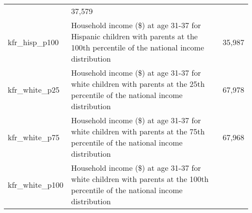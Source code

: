 \documentclass[]{book}
\begin{document}
\begin{longtable}[]{@{}lll@{}}
\begin{minipage}[t]{0.04\columnwidth}
\end{minipage} & \begin{minipage}[t]{0.04\columnwidth}\raggedright\strut
37,579\strut
\end{minipage}\tabularnewline
\begin{minipage}[t]{0.04\columnwidth}\raggedright\strut
kfr\_hisp\_p100\strut
\end{minipage} & \begin{minipage}[t]{0.04\columnwidth}\raggedright\strut
Household income (\$) at age 31-37 for Hispanic children with parents at
the 100th percentile of the national income distribution\strut
\end{minipage} & \begin{minipage}[t]{0.04\columnwidth}\raggedright\strut
35,987\strut
\end{minipage}\tabularnewline
\begin{minipage}[t]{0.04\columnwidth}\raggedright\strut
kfr\_white\_p25\strut
\end{minipage} & \begin{minipage}[t]{0.04\columnwidth}\raggedright\strut
Household income (\$) at age 31-37 for white children with parents at
the 25th percentile of the national income distribution\strut
\end{minipage} & \begin{minipage}[t]{0.04\columnwidth}\raggedright\strut
67,978\strut
\end{minipage}\tabularnewline
\begin{minipage}[t]{0.04\columnwidth}\raggedright\strut
kfr\_white\_p75\strut
\end{minipage} & \begin{minipage}[t]{0.04\columnwidth}\raggedright\strut
Household income (\$) at age 31-37 for white children with parents at
the 75th percentile of the national income distribution\strut
\end{minipage} & \begin{minipage}[t]{0.04\columnwidth}\raggedright\strut
67,968\strut
\end{minipage}\tabularnewline
\begin{minipage}[t]{0.04\columnwidth}\raggedright\strut
kfr\_white\_p100\strut
\end{minipage} & \begin{minipage}[t]{0.04\columnwidth}\raggedright\strut
Household income (\$) at age 31-37 for white children with parents at
the 100th percentile of the national income distribution\strut
\end{minipage} & \begin{minipage}[t]{0.04\columnwidth}\raggedright\strut

\end{minipage}
\end{longtable}
\end{document}
